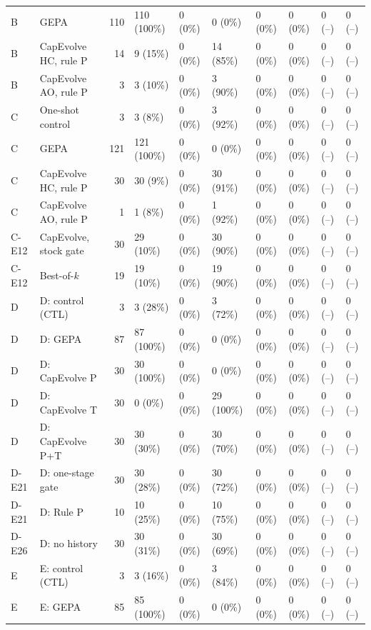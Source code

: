 \begin{table}[t]
\begin{tabular}{@{}llrlllllll@{}}
B & GEPA & 110 & 110 (100\%) & 0 (0\%) & 0 (0\%) & 0 (0\%) & 0 (0\%) & 0 (--) & 0 (--) \\
B & CapEvolve HC, rule P & 14 & 9 (15\%) & 0 (0\%) & 14 (85\%) & 0 (0\%) & 0 (0\%) & 0 (--) & 0 (--) \\
B & CapEvolve AO, rule P & 3 & 3 (10\%) & 0 (0\%) & 3 (90\%) & 0 (0\%) & 0 (0\%) & 0 (--) & 0 (--) \\
C & One-shot control & 3 & 3 (8\%) & 0 (0\%) & 3 (92\%) & 0 (0\%) & 0 (0\%) & 0 (--) & 0 (--) \\
C & GEPA & 121 & 121 (100\%) & 0 (0\%) & 0 (0\%) & 0 (0\%) & 0 (0\%) & 0 (--) & 0 (--) \\
C & CapEvolve HC, rule P & 30 & 30 (9\%) & 0 (0\%) & 30 (91\%) & 0 (0\%) & 0 (0\%) & 0 (--) & 0 (--) \\
C & CapEvolve AO, rule P & 1 & 1 (8\%) & 0 (0\%) & 1 (92\%) & 0 (0\%) & 0 (0\%) & 0 (--) & 0 (--) \\
C-E12 & CapEvolve, stock gate & 30 & 29 (10\%) & 0 (0\%) & 30 (90\%) & 0 (0\%) & 0 (0\%) & 0 (--) & 0 (--) \\
C-E12 & Best-of-$k$ & 19 & 19 (10\%) & 0 (0\%) & 19 (90\%) & 0 (0\%) & 0 (0\%) & 0 (--) & 0 (--) \\
D & D: control (CTL) & 3 & 3 (28\%) & 0 (0\%) & 3 (72\%) & 0 (0\%) & 0 (0\%) & 0 (--) & 0 (--) \\
D & D: GEPA & 87 & 87 (100\%) & 0 (0\%) & 0 (0\%) & 0 (0\%) & 0 (0\%) & 0 (--) & 0 (--) \\
D & D: CapEvolve P & 30 & 30 (100\%) & 0 (0\%) & 0 (0\%) & 0 (0\%) & 0 (0\%) & 0 (--) & 0 (--) \\
D & D: CapEvolve T & 30 & 0 (0\%) & 0 (0\%) & 29 (100\%) & 0 (0\%) & 0 (0\%) & 0 (--) & 0 (--) \\
D & D: CapEvolve P+T & 30 & 30 (30\%) & 0 (0\%) & 30 (70\%) & 0 (0\%) & 0 (0\%) & 0 (--) & 0 (--) \\
D-E21 & D: one-stage gate & 30 & 30 (28\%) & 0 (0\%) & 30 (72\%) & 0 (0\%) & 0 (0\%) & 0 (--) & 0 (--) \\
D-E21 & D: Rule P & 10 & 10 (25\%) & 0 (0\%) & 10 (75\%) & 0 (0\%) & 0 (0\%) & 0 (--) & 0 (--) \\
D-E26 & D: no history & 30 & 30 (31\%) & 0 (0\%) & 30 (69\%) & 0 (0\%) & 0 (0\%) & 0 (--) & 0 (--) \\
E & E: control (CTL) & 3 & 3 (16\%) & 0 (0\%) & 3 (84\%) & 0 (0\%) & 0 (0\%) & 0 (--) & 0 (--) \\
E & E: GEPA & 85 & 85 (100\%) & 0 (0\%) & 0 (0\%) & 0 (0\%) & 0 (0\%) & 0 (--) & 0 (--) \\

\end{tabular}
\end{table}

